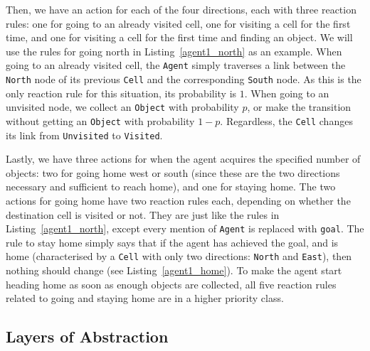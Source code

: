 \documentclass[runningheads]{llncs}
\begin{document}


Then, we have an action for each of the four directions, each with three
reaction rules: one for going to an already visited cell, one for visiting a
cell for the first time, and one for visiting a cell for the first time and
finding an object. We will use the rules for going north in
Listing~\ref{agent1_north} as an example. When going to an already visited cell,
the \texttt{Agent} simply traverses a link between the \texttt{North} node of
its previous \texttt{Cell} and the corresponding \texttt{South} node. As this is
the only reaction rule for this situation, its probability is $1$. When going to
an unvisited node, we collect an \texttt{Object} with probability $p$, or make
the transition without getting an \texttt{Object} with probability $1-p$.
Regardless, the \texttt{Cell} changes its link from \texttt{Unvisited} to
\texttt{Visited}.



Lastly, we have three actions for when the agent acquires the specified number
of objects: two for going home west or south (since these are the two directions
necessary and sufficient to reach home), and one for staying home. The two
actions for going home have two reaction rules each, depending on whether the
destination cell is visited or not. They are just like the rules in
Listing~\ref{agent1_north}, except every mention of \texttt{Agent} is replaced
with \texttt{goal}. The rule to stay home simply says that if the agent has
achieved the goal, and is home (characterised by a \texttt{Cell} with only two
directions: \texttt{North} and \texttt{East}), then nothing should change (see
Listing~\ref{agent1_home}). To make the agent start heading home as soon as
enough objects are collected, all five reaction rules related to going and
staying home are in a higher priority class.

\subsection{Layers of Abstraction}
\end{document}
